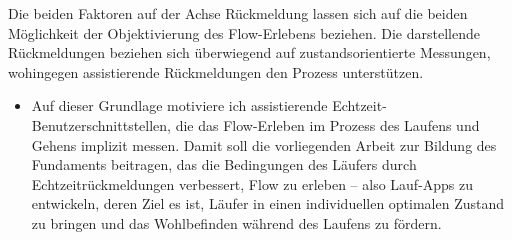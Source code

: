 Die beiden Faktoren auf der Achse Rückmeldung lassen sich auf die beiden Möglichkeit der Objektivierung des Flow-Erlebens beziehen. Die darstellende Rückmeldungen beziehen sich überwiegend auf zustandsorientierte Messungen, wohingegen assistierende Rückmeldungen den Prozess unterstützen. 
\begin{itemize}
	
	\item Auf dieser Grundlage motiviere ich assistierende Echtzeit-Benutzerschnittstellen, die das Flow-Erleben im Prozess des Laufens und Gehens implizit messen. Damit soll die vorliegenden Arbeit zur Bildung des Fundaments beitragen, das die Bedingungen des Läufers durch Echtzeitrückmeldungen verbessert, Flow zu erleben -- also Lauf-Apps zu entwickeln, deren Ziel es ist, Läufer in einen individuellen optimalen Zustand zu bringen und das Wohlbefinden während des Laufens zu fördern. 
\end{itemize}

